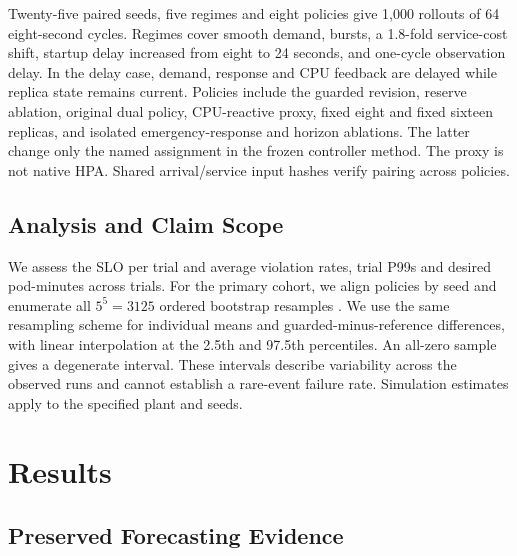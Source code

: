 \documentclass[10pt,twocolumn,a4paper]{article}
\begin{document}
Twenty-five paired seeds, five regimes and eight policies give 1,000 rollouts of 64 eight-second cycles. Regimes cover smooth demand, bursts, a 1.8-fold service-cost shift, startup delay increased from eight to 24 seconds, and one-cycle observation delay. In the delay case, demand, response and CPU feedback are delayed while replica state remains current. Policies include the guarded revision, reserve ablation, original dual policy, CPU-reactive proxy, fixed eight and fixed sixteen replicas, and isolated emergency-response and horizon ablations. The latter change only the named assignment in the frozen controller method. The proxy is not native HPA. Shared arrival/service input hashes verify pairing across policies.

\subsection{Analysis and Claim Scope}
We assess the SLO per trial and average violation rates, trial P99s and desired pod-minutes across trials. For the primary cohort, we align policies by seed and enumerate all $5^5=3125$ ordered bootstrap resamples \cite{bootstrap}. We use the same resampling scheme for individual means and guarded-minus-reference differences, with linear interpolation at the 2.5th and 97.5th percentiles. An all-zero sample gives a degenerate interval. These intervals describe variability across the observed runs and cannot establish a rare-event failure rate. Simulation estimates apply to the specified plant and seeds.

\section{Results}
\subsection{Preserved Forecasting Evidence}


\begin{table}[t]\centering\small\setlength{\tabcolsep}{3pt}
\caption{Held-out historical demand upper-bound coverage (\%), nominal 90\%. This analysis uses a new calibration prefix of saved test predictions and does not change predictor weights.}\label{tab:historical}
\ifdim\wd\databox>\columnwidth\relax\resizebox{\columnwidth}{!}{\usebox{\databox}}\else\usebox{\databox}\fi
\end{table}
\end{document}
